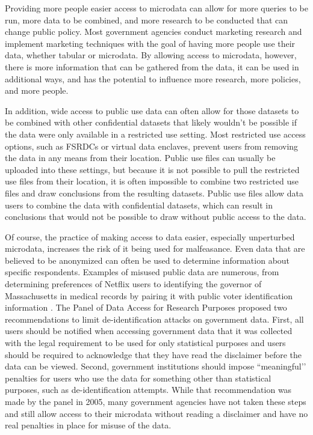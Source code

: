 \documentclass[12pt]{article}
\begin{document}
Providing more people easier access to microdata can allow for more queries to be run, more data to be combined, and more research to be conducted that can change public policy. Most government agencies conduct marketing research and implement marketing techniques with the goal of having more people use their data, whether tabular or microdata. By allowing access to microdata, however, there is more information that can be gathered from the data, it can be used in additional ways, and has the potential to influence more research, more policies, and more people.

In addition, wide access to public use data can often allow for those datasets to be combined with other confidential datasets that likely wouldn’t be possible if the data were only available in a restricted use setting. Most restricted use access options, such as FSRDCs or virtual data enclaves, prevent users from removing the data in any means from their location. Public use files can usually be uploaded into these settings, but because it is not possible to pull the restricted use files from their location, it is often impossible to combine two restricted use files and draw conclusions from the resulting datasets. Public use files allow data users to combine the data with confidential datasets, which can result in conclusions that would not be possible to draw without public access to the data. 

Of course, the practice of making access to data easier, especially unperturbed microdata, increases the risk of it being used for malfeasance. Even data that are believed to be anonymized can often be used to determine information about specific respondents. Examples of misused public data are numerous, from determining preferences of Netflix users  to identifying the governor of Massachusetts in medical records by pairing it with public voter identification information . The Panel of Data Access for Research Purposes proposed two recommendations to limit de-identification attacks on government data. First, all users should be notified when accessing government data that it was collected with the legal requirement to be used for only statistical purposes and users should be required to acknowledge that they have read the disclaimer before the data can be viewed. Second, government institutions should impose ``meaningful’’ penalties for users who use the data for something other than statistical purposes, such as de-identification attempts. While that recommendation was made by the panel in 2005, many government agencies have not taken these steps and still allow access to their microdata without reading a disclaimer and have no real penalties in place for misuse of the data.
\end{document}
